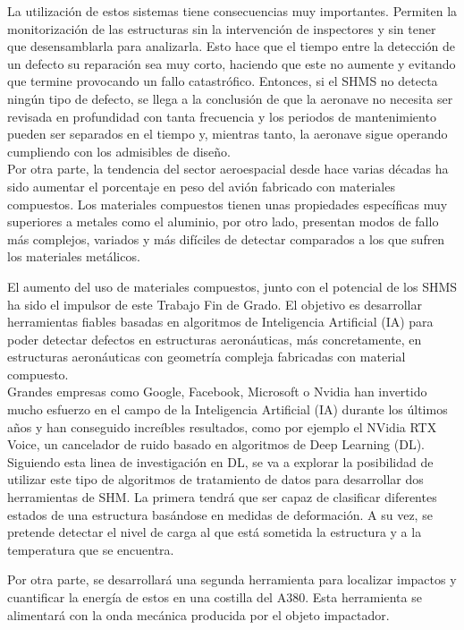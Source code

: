 La utilización de estos sistemas tiene consecuencias muy importantes. Permiten la monitorización de las estructuras sin la intervención de inspectores y sin tener que desensamblarla para analizarla. Esto hace que el tiempo entre la detección de un defecto su reparación sea muy corto, haciendo que este no aumente y evitando que termine provocando un fallo catastrófico. Entonces, si el SHMS no detecta ningún tipo de defecto, se llega a la conclusión de que la aeronave no necesita ser revisada en profundidad con tanta frecuencia y los periodos de mantenimiento pueden ser separados en el tiempo y, mientras tanto, la aeronave sigue operando cumpliendo con los admisibles de diseño.\\

Por otra parte, la tendencia del sector aeroespacial desde hace varias décadas ha sido aumentar el porcentaje en peso del avión fabricado con materiales compuestos. Los materiales compuestos tienen unas propiedades específicas muy superiores a metales como el aluminio, por otro lado, presentan modos de fallo más complejos, variados y más difíciles de detectar comparados a los que sufren los materiales metálicos.

El aumento del uso de materiales compuestos, junto con el potencial de los SHMS ha sido el impulsor de este Trabajo Fin de Grado. El objetivo es desarrollar herramientas fiables basadas en algoritmos de Inteligencia Artificial (IA) para poder detectar defectos en estructuras aeronáuticas, más concretamente, en estructuras aeronáuticas con geometría compleja fabricadas con material compuesto.\\
 
Grandes empresas como Google, Facebook, Microsoft o Nvidia han invertido mucho esfuerzo en el campo de la Inteligencia Artificial (IA) durante los últimos años y han conseguido increíbles resultados, como por ejemplo el NVidia RTX Voice, un cancelador de ruido basado en algoritmos de Deep Learning (DL).\\

Siguiendo esta linea de investigación en DL, se va a explorar la posibilidad de utilizar este tipo de algoritmos de tratamiento de datos para desarrollar dos herramientas de SHM. La primera tendrá que ser capaz de clasificar diferentes estados de una estructura basándose en medidas de deformación. A su vez, se pretende detectar el nivel de carga al que está sometida la estructura y a la temperatura que se encuentra.

Por otra parte, se desarrollará una segunda herramienta para localizar impactos y cuantificar la energía de estos en una costilla del A380. Esta herramienta se alimentará con la onda mecánica producida por el objeto impactador.\\

